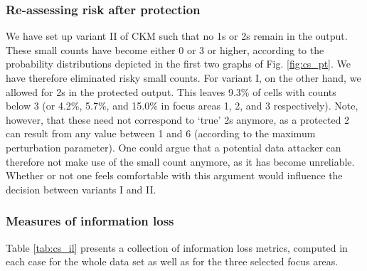 \subsubsection{Re-assessing risk after protection}

We have set up variant II of CKM such that no 1s or 2s remain in the output. 
These small counts have become either 0 or 3 or higher, according to the probability distributions depicted in the first two graphs of Fig. \ref{fig:cs_pt}. We have therefore eliminated risky small counts. For variant I, on the other hand, we allowed for 2s in the protected output.
This leaves 9.3\% of cells with counts below 3 (or 4.2\%, 5.7\%, and 15.0\% in focus areas 1, 2, and 3 respectively).
Note, however, that these need not correspond to `true' 2s anymore, as a protected 2 can result from any value between 1 and 6 (according to the maximum perturbation parameter). One could argue that a potential data attacker can therefore not make use of the small count anymore, as it has become unreliable. Whether or not one feels comfortable with this argument would influence the decision between variants I and II.

\subsubsection{Measures of information loss}

Table \ref{tab:cs_il} presents a collection of information loss metrics, computed in each case for the whole data set as well as for the three selected focus areas.

